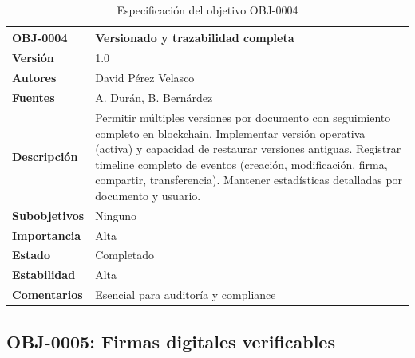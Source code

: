 \documentclass[11pt, a4paper]{article}
\begin{document}
\begin{table}[H]
    \centering
    \small
    \begin{tabular}{|p{4cm}|p{10cm}|}
    \hline
    \textbf{OBJ-0004} & Versionado y trazabilidad completa \\
    \hline
    \textbf{Versión} & 1.0 \\
    \hline
    \textbf{Autores} & David Pérez Velasco \\
    \hline
    \textbf{Fuentes} & A. Durán, B. Bernárdez \\
    \hline
    \textbf{Descripción} & Permitir múltiples versiones por documento con seguimiento completo en blockchain. Implementar versión operativa (activa) y capacidad de restaurar versiones antiguas. Registrar timeline completo de eventos (creación, modificación, firma, compartir, transferencia). Mantener estadísticas detalladas por documento y usuario. \\
    \hline
    \textbf{Subobjetivos} & Ninguno \\
    \hline
    \textbf{Importancia} & Alta \\
    \hline
    \textbf{Estado} & Completado \\
    \hline
    \textbf{Estabilidad} & Alta \\
    \hline
    \textbf{Comentarios} & Esencial para auditoría y compliance \\
    \hline
    \end{tabular}
    \caption{Especificación del objetivo OBJ-0004}
\end{table}

\subsection{OBJ-0005: Firmas digitales verificables}
\end{document}
